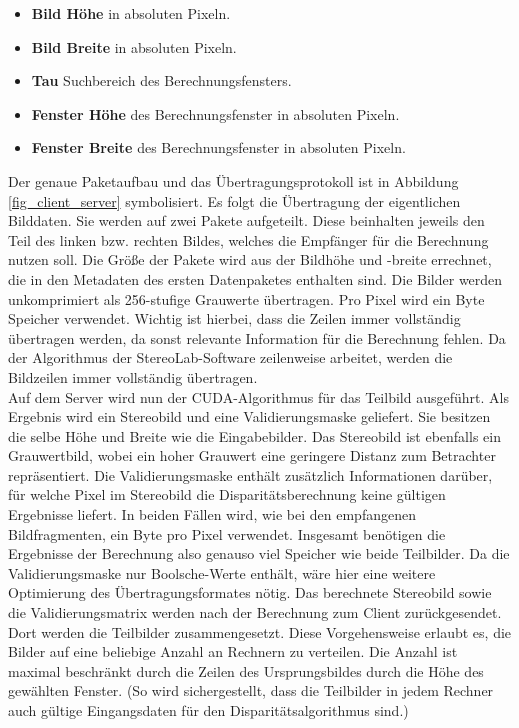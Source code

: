 \documentclass[conference]{IEEEtran}
\begin{document}
\begin{itemize}
\item \textbf{Bild Höhe} in absoluten Pixeln.
\item \textbf{Bild Breite} in absoluten Pixeln.
\item \textbf{Tau} Suchbereich des Berechnungsfensters.
\item \textbf{Fenster Höhe} des Berechnungsfenster in absoluten Pixeln.
\item \textbf{Fenster Breite} des Berechnungsfenster in absoluten Pixeln.
\end{itemize}


Der genaue Paketaufbau und das Übertragungsprotokoll ist in Abbildung \ref{fig_client_server} symbolisiert. Es folgt die Übertragung der eigentlichen Bilddaten. Sie werden auf zwei Pakete aufgeteilt. Diese beinhalten jeweils den Teil des linken bzw. rechten Bildes, welches die Empfänger für die Berechnung nutzen soll. Die Größe der Pakete wird aus der Bildhöhe und -breite errechnet, die in den Metadaten des ersten Datenpaketes enthalten sind. Die Bilder werden unkomprimiert als 256-stufige Grauwerte übertragen. Pro Pixel wird ein Byte Speicher verwendet.
 Wichtig ist hierbei, dass die Zeilen immer vollständig übertragen werden, da sonst relevante Information für die Berechnung fehlen.
Da der Algorithmus der StereoLab-Software zeilenweise arbeitet, werden die Bildzeilen immer vollständig übertragen. \\%
Auf dem Server wird nun der CUDA-Algorithmus für das Teilbild ausgeführt. Als Ergebnis wird ein Stereobild und eine Validierungsmaske geliefert. Sie besitzen die selbe Höhe und Breite wie die Eingabebilder. Das Stereobild ist ebenfalls ein Grauwertbild, wobei ein hoher Grauwert eine geringere Distanz zum Betrachter repräsentiert. Die Validierungsmaske enthält zusätzlich Informationen darüber, für welche Pixel im Stereobild die Disparitätsberechnung keine gültigen Ergebnisse liefert. In beiden Fällen wird, wie bei den empfangenen Bildfragmenten, ein Byte pro Pixel verwendet. Insgesamt benötigen die Ergebnisse der Berechnung also genauso viel Speicher wie beide Teilbilder.  Da die Validierungsmaske nur Boolsche-Werte enthält, wäre hier eine weitere Optimierung des Übertragungsformates nötig. %
Das berechnete Stereobild sowie die Validierungsmatrix werden nach der Berechnung zum Client zurückgesendet. Dort werden die Teilbilder zusammengesetzt. Diese Vorgehensweise erlaubt es, die Bilder auf eine beliebige Anzahl an Rechnern zu verteilen. Die Anzahl ist maximal beschränkt durch die Zeilen des Ursprungsbildes durch die Höhe des gewählten Fenster. (So wird sichergestellt, dass die Teilbilder in jedem Rechner auch gültige Eingangsdaten für den Disparitätsalgorithmus sind.) %
\end{document}
